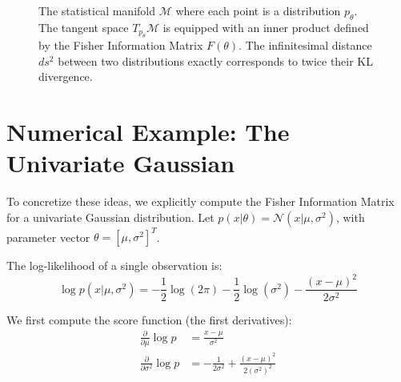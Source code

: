 \begin{figure}[htbp]
\centering
{}
\caption{The statistical manifold $\mathcal{M}$ where each point is a distribution $p_\theta$. The tangent space $T_{p_\theta}\mathcal{M}$ is equipped with an inner product defined by the Fisher Information Matrix $F(\theta)$. The infinitesimal distance $ds^2$ between two distributions exactly corresponds to twice their KL divergence.}
\label{fig:fisher_manifold}
\end{figure}

\section{Numerical Example: The Univariate Gaussian}

To concretize these ideas, we explicitly compute the Fisher Information Matrix for a univariate Gaussian distribution. Let $p(x|\theta) = \mathcal{N}(x | \mu, \sigma^2)$, with parameter vector $\theta = [\mu, \sigma^2]^T$.

The log-likelihood of a single observation is:
\begin{equation*}
    \log p(x|\mu, \sigma^2) = -\frac{1}{2}\log(2\pi) - \frac{1}{2}\log(\sigma^2) - \frac{(x-\mu)^2}{2\sigma^2}
\end{equation*}

We first compute the score function (the first derivatives):
\begin{align*}
    \frac{\partial}{\partial \mu} \log p &= \frac{x-\mu}{\sigma^2} \\
    \frac{\partial}{\partial \sigma^2} \log p &= -\frac{1}{2\sigma^2} + \frac{(x-\mu)^2}{2(\sigma^2)^2}
\end{align*}

